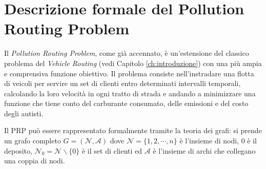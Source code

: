 \chapter{Descrizione formale del Pollution Routing Problem}\label{ch:cap_2}

Il \emph{Pollution Routing Problem}, come già accennato, è un’estensione del classico problema del \emph{Vehicle Routing} (vedi Capitolo \ref{ch:introduzione}) con una più ampia e comprensiva funzione obiettivo. Il problema consiste nell’instradare una flotta di veicoli per servire un set di clienti entro determinati intervalli temporali, calcolando la loro velocità in ogni tratto di strada e andando a minimizzare una funzione che tiene conto del carburante consumato, delle emissioni e del costo degli autisti. 

Il PRP può essere rappresentato formalmente tramite la teoria dei grafi: si prende un grafo completo $G = (\mathcal{N},\mathcal{A})$ dove $\mathcal{N} = \{1, 2, \cdots, n\}$ è l'insieme di nodi, $0$ è il deposito, $\mathcal{N}_0 = \mathcal{N} \backslash \{0\}$ è il set di clienti ed $\mathcal{A}$ è l'insieme di archi che collegano una coppia di nodi.